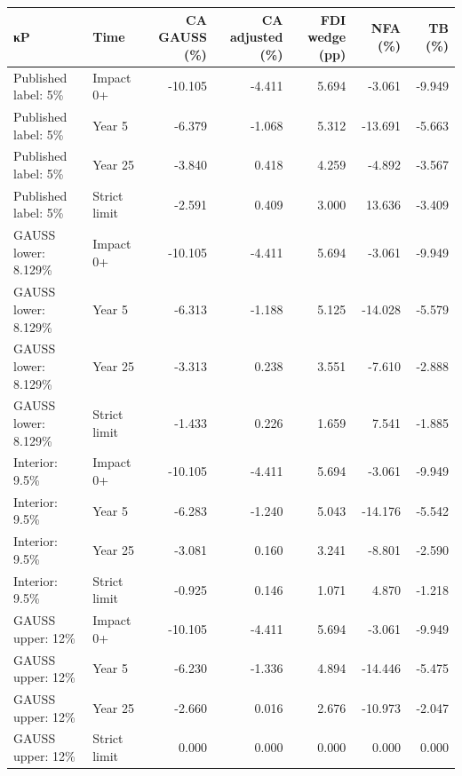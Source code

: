 \begin{table}[!ht]
\setlength\tabcolsep{0.425em}
\setlength\aboverulesep{0pt}
\setlength\belowrulesep{0.2em}
\centering
\begin{threeparttable}
\begin{tabular}{llrrrrr}
\toprule[0.1em]
\textbf{κP} & \textbf{Time} & \textbf{CA GAUSS (\%)} & \textbf{CA adjusted (\%)} & \textbf{FDI wedge (pp)} & \textbf{NFA (\%)} & \textbf{TB (\%)} \\[0.2em]
\midrule[0.075em]
Published label: 5\% & Impact 0+ & -10.105 & -4.411 & 5.694 & -3.061 & -9.949 \\[0.2em]
Published label: 5\% & Year 5 & -6.379 & -1.068 & 5.312 & -13.691 & -5.663 \\[0.2em]
Published label: 5\% & Year 25 & -3.840 & 0.418 & 4.259 & -4.892 & -3.567 \\[0.2em]
Published label: 5\% & Strict limit & -2.591 & 0.409 & 3.000 & 13.636 & -3.409 \\[0.2em]
GAUSS lower: 8.129\% & Impact 0+ & -10.105 & -4.411 & 5.694 & -3.061 & -9.949 \\[0.2em]
GAUSS lower: 8.129\% & Year 5 & -6.313 & -1.188 & 5.125 & -14.028 & -5.579 \\[0.2em]
GAUSS lower: 8.129\% & Year 25 & -3.313 & 0.238 & 3.551 & -7.610 & -2.888 \\[0.2em]
GAUSS lower: 8.129\% & Strict limit & -1.433 & 0.226 & 1.659 & 7.541 & -1.885 \\[0.2em]
Interior: 9.5\% & Impact 0+ & -10.105 & -4.411 & 5.694 & -3.061 & -9.949 \\[0.2em]
Interior: 9.5\% & Year 5 & -6.283 & -1.240 & 5.043 & -14.176 & -5.542 \\[0.2em]
Interior: 9.5\% & Year 25 & -3.081 & 0.160 & 3.241 & -8.801 & -2.590 \\[0.2em]
Interior: 9.5\% & Strict limit & -0.925 & 0.146 & 1.071 & 4.870 & -1.218 \\[0.2em]
GAUSS upper: 12\% & Impact 0+ & -10.105 & -4.411 & 5.694 & -3.061 & -9.949 \\[0.2em]
GAUSS upper: 12\% & Year 5 & -6.230 & -1.336 & 4.894 & -14.446 & -5.475 \\[0.2em]
GAUSS upper: 12\% & Year 25 & -2.660 & 0.016 & 2.676 & -10.973 & -2.047 \\[0.2em]
GAUSS upper: 12\% & Strict limit & 0.000 & 0.000 & 0.000 & 0.000 & 0.000 \\[0.2em]
\bottomrule[0.1em]
\end{tabular}
\end{threeparttable}
\end{table}
